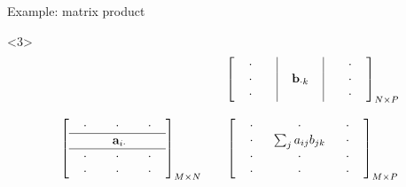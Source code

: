 \documentclass[12pt,aspectratio=1610]{beamer}
\begin{document}
\begin{frame}{Example: matrix product}
\begin{onlyenv}<3>
\small
\[
\begin{array}{ccc}
&& \left[\begin{array}{c|c|c}
\ \ \cdot \ \ \ \ \, &   & \, \ \ \ \ \cdot \ \ \\
\ \ \cdot \ \ \ \ \, & \ \ \mb b_{\cdot k} \ \ & \, \ \ \ \ \cdot \ \ \\
\ \ \cdot \ \ \ \ \, & & \, \ \ \ \ \cdot \ \ \\
\end{array}\right]_{N \times P}\\
\\
\left[\begin{array}{ccc}
\ \ \cdot \ \ & \ \ \cdot \ \  & \ \ \cdot \ \ \\
\hline
& \ \mb a_{i\cdot} & \\
 \hline
\ \ \cdot \ \ & \ \ \cdot \ \  & \ \ \cdot \ \ \\
\ \ \cdot \ \ & \ \ \cdot \ \  & \ \ \cdot \ \ \\
\end{array}\right]_{M \times N}
&& \left[\begin{array}{ccc}
\ \ \cdot \ \ & \ \ \cdot \ \  & \ \ \cdot \ \ \\
\ \ \cdot \ \ & \sum_j a_{ij}b_{jk} & \ \ \cdot \ \ \\
\ \ \cdot \ \ & \ \ \cdot \ \  & \ \ \cdot \ \ \\
\ \ \cdot \ \ & \ \ \cdot \ \  & \ \ \cdot \ \ \\
\end{array}\right]_{M \times P}
\end{array}
\]
\end{onlyenv}
\end{frame}
\end{document}
